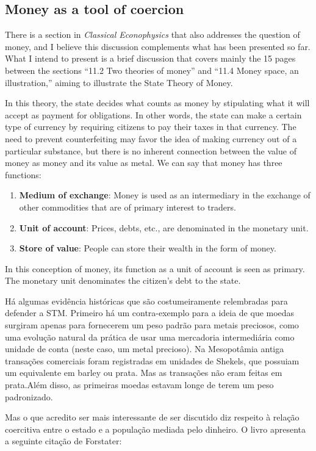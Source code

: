 \subsection{Money as a tool of coercion}

There is a section in \textit{Classical Econophysics} that also addresses the question of money, and I believe this discussion complements what has been presented so far. What I intend to present is a brief discussion that covers mainly the 15 pages between the sections “11.2 Two theories of money” and “11.4 Money space, an illustration,” aiming to illustrate the State Theory of Money.

In this theory, the state decides what counts as money by stipulating what it will accept as payment for obligations. In other words, the state can make a certain type of currency by requiring citizens to pay their taxes in that currency. The need to prevent counterfeiting may favor the idea of making currency out of a particular substance, but there is no inherent connection between the value of money as money and its value as metal. We can say that money has three functions:

\begin{enumerate}
    \item \textbf{Medium of exchange}: Money is used as an intermediary in the exchange of other commodities that are of primary interest to traders.
    \item \textbf{Unit of account}: Prices, debts, etc., are denominated in the monetary unit.
    \item \textbf{Store of value}: People can store their wealth in the form of money.
\end{enumerate}
In this conception of money, its function as a unit of account is seen as primary. The monetary unit denominates the citizen’s debt to the state.

Há algumas evidência históricas que são costumeiramente relembradas para defender a STM. Primeiro há um contra-exemplo para a ideia de que moedas surgiram apenas para fornecerem um peso padrão para metais preciosos, como uma evolução natural da prática de usar uma mercadoria intermediária como unidade de conta (neste caso, um metal precioso). Na Mesopotâmia antiga transações comerciais foram registradas em unidades de Shekels, que possuiam um equivalente em barley ou prata. Mas as transações não eram feitas em prata.Além disso, as primeiras moedas estavam longe de terem um peso padronizado.

Mas o que acredito ser mais interessante de ser discutido diz respeito à relação coercitiva entre o estado e a população mediada pelo dinheiro. O livro apresenta a seguinte citação de Forstater:

